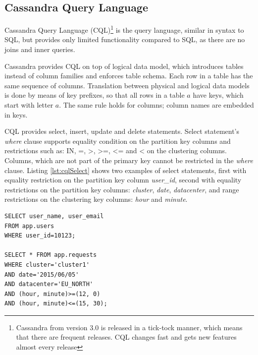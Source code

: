 


\subsection{Cassandra Query Language}
\label{sec:theory:cassandra:cql}
Cassandra Query Language (CQL)\footnote{Cassandra from version 3.0 is released in a tick-tock manner, which means that there are frequent releases. CQL changes fast and gets new features almost every release} is the query language, similar in syntax to SQL, but provides only limited functionality compared to SQL, as there are no joins and inner queries. 

Cassandra provides CQL on top of logical data model, which introduces tables instead of column families and enforces table schema. Each row in a table has the same sequence of columns. Translation between physical and logical data models is done by means of key prefixes, so that all rows in a table $a$ have keys, which start with letter $a$. The same rule holds for columns; column names are embedded in keys.

CQL provides select, insert, update and delete statements. Select statement's \emph{where} clause supports equality condition on the partition key columns and restrictions such as: IN, =, >, >=, <= and < on the clustering columns. Columns, which are not part of the primary key cannot be restricted in the \emph{where} clause. Listing \ref{lst:cqlSelect} shows two examples of select statements, first with equality restriction on the partition key column \emph{user_id}, second with equality restrictions on the partition key columns: \emph{cluster}, \emph{date}, \emph{datacenter}, and range restrictions on the clustering key columns: \emph{hour} and \emph{minute}.

\begin{lstlisting}[style=outcode,label={lst:cqlSelect},caption={Examples of CQL select statements}]
SELECT user_name, user_email 
FROM app.users 
WHERE user_id=10123;
    
SELECT * FROM app.requests
WHERE cluster='cluster1'
AND date='2015/06/05'
AND datacenter='EU_NORTH'
AND (hour, minute)>=(12, 0) 
AND (hour, minute)<=(15, 30);
\end{lstlisting}

